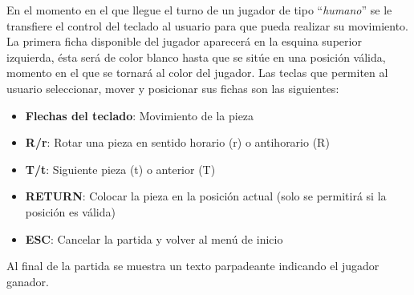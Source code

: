 En el momento en el que llegue el turno de un jugador de tipo
``\textsl{humano}'' se le transfiere el control del teclado al usuario para que
pueda realizar su movimiento. La primera ficha disponible del jugador aparecerá
en la esquina superior izquierda, ésta será de color blanco hasta que se sitúe
en una posición válida, momento en el que se tornará al color del jugador. Las
teclas que permiten al usuario seleccionar, mover y posicionar sus fichas son
las siguientes:

\begin{itemize}
	\item \textbf{Flechas del teclado}: Movimiento de la pieza
	\item \textbf{R/r}: Rotar una pieza en sentido horario (r) o antihorario
		(R)
	\item \textbf{T/t}: Siguiente pieza (t) o anterior (T)
	\item \textbf{RETURN}: Colocar la pieza en la posición actual (solo se
		permitirá si la posición es válida)
	\item \textbf{ESC}: Cancelar la partida y volver al menú de inicio
\end{itemize}

Al final de la partida se muestra un texto parpadeante indicando el jugador
ganador.

